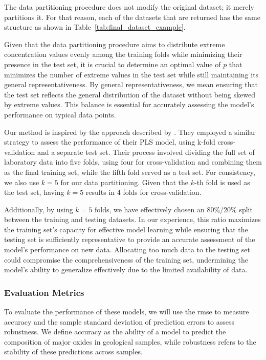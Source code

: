 The data partitioning procedure does not modify the original dataset; it merely partitions it.
For that reason, each of the datasets that are returned has the same structure as shown in Table~\ref{tab:final_dataset_example}.

Given that the data partitioning procedure aims to distribute extreme concentration values evenly among the training folds while minimizing their presence in the test set, it is crucial to determine an optimal value of $p$ that minimizes the number of extreme values in the test set while still maintaining its general representativeness.
By general representativeness, we mean ensuring that the test set reflects the general distribution of the dataset without being skewed by extreme values.
This balance is essential for accurately assessing the model's performance on typical data points.

Our method is inspired by the approach described by \citet{andersonImprovedAccuracyQuantitative2017}.
They employed a similar strategy to assess the performance of their PLS model, using k-fold cross-validation and a separate test set.
Their process involved dividing the full set of laboratory data into five folds, using four for cross-validation and combining them as the final training set, while the fifth fold served as a test set.
For consistency, we also use $k = 5$ for our data partitioning.
Given that the $k$-th fold is used as the test set, having $k = 5$ results in 4 folds for cross-validation.

Additionally, by using $k = 5$ folds, we have effectively chosen an 80\%/20\% split between the training and testing datasets.
In our experience, this ratio maximizes the training set's capacity for effective model learning while ensuring that the testing set is sufficiently representative to provide an accurate assessment of the model's performance on new data.
Allocating too much data to the testing set could compromise the comprehensiveness of the training set, undermining the model's ability to generalize effectively due to the limited availability of data.

\subsubsection{Evaluation Metrics}\label{subsec:evaluation_metrics}
To evaluate the performance of these models, we will use the \gls{rmse} to measure accuracy and the sample standard deviation of prediction errors to assess robustness.
We define accuracy as the ability of a model to predict the composition of major oxides in geological samples, while robustness refers to the stability of these predictions across samples.

